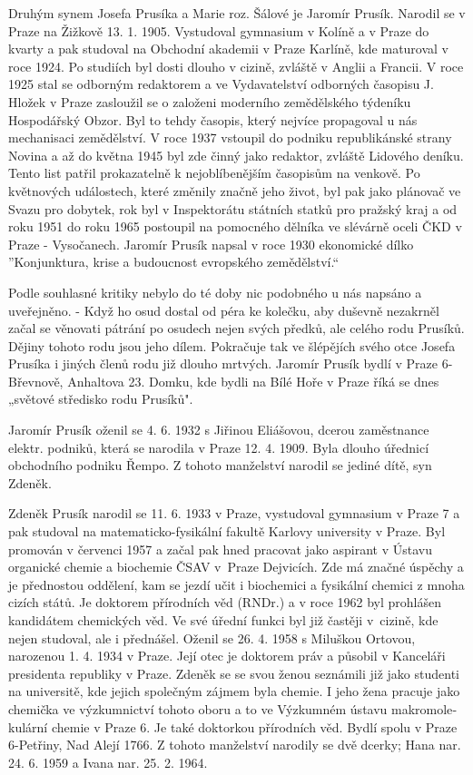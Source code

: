\documentclass[../dejiny-rodu-prusiku.tex]{subfiles}
\begin{document}
Druhým synem Josefa Prusíka a Marie roz. Šálové je Jaromír Prusík. Narodil se v Praze na Žižkově 13. 1. 1905. Vystudoval gymnasium v Kolíně a v Praze do kvarty a pak studoval na Obchodní akademii v Praze Karlíně, kde maturoval v roce 1924. Po studiích byl dosti dlouho v cizi­ně, zvláště v Anglii a Francii. V roce 1925 stal se odbor­ným redaktorem a ve Vydavatelství odborných časopisu  J. Hložek v Praze zasloužil se o založeni moderního zemědělského týdeníku Hospodářský Obzor. Byl to tehdy časopis, který nejvíce propagoval u nás mechanisaci zemědělství. V roce 1937 vstoupil do podniku republikánské strany Novina a až do května 1945 byl zde činný jako redaktor, zvláště Lidového deníku. Tento list patřil prokazatelně k nejoblíbenějším časopisům na venkově. Po květnových událostech, které změnily značně jeho ži­vot, byl pak jako plánovač ve Svazu pro dobytek, rok byl v Inspektorátu státních statků pro pražský kraj a od roku 1951 do roku 1965 postoupil na pomocného dělníka ve slévárně oceli ČKD v Praze - Vysočanech. Jaromír Prusík napsal v roce 1930 ekonomické dílko ''Konjunktura, krise a budoucnost evropského zemědělství.“

Podle souhlasné kritiky nebylo do té doby nic podobného u nás napsáno a uveřejněno. - Když ho osud dostal od péra ke kolečku, aby duševně nezakrněl začal se věnovati pátrání po osudech nejen svých před­ků, ale celého rodu Prusíků. Dějiny tohoto rodu jsou jeho dílem. Pokračuje tak ve šlépějích svého otce Josefa Prusíka i jiných členů rodu již dlouho mrtvých. Jaromír Prusík bydlí v Praze 6-Břevnově, Anhaltova 23. Domku, kde bydli na Bílé Hoře v Praze říká se dnes „světo­vé středisko rodu Prusíků".

Jaromír Prusík oženil se 4. 6. 1932 s Jiřinou Eliášovou, dcerou zaměstnance elektr. podniků, která se narodila v Praze 12. 4. 1909. Byla dlouho úřednicí obchodního podniku Řempo. Z tohoto manželství narodil se jediné dítě, syn Zdeněk.

Zdeněk Prusík narodil se 11. 6. 1933 v Praze, vystudoval gymnasium v Praze 7 a pak studoval na matematicko-fysikální fakultě Karlovy university v Praze. Byl promován v červenci 1957 a začal pak hned pracovat jako aspi­rant v Ústavu organické chemie a biochemie ČSAV v Praze Dejvicích. Zde má značné úspěchy a je přednostou odděle­ní, kam se jezdí učit i biochemici a fysikální chemici z mnoha cizích států. Je doktorem přírodních věd (RNDr.) a v roce 1962 byl prohlášen kandidátem chemických věd. Ve své úřední funkci byl již častěji v cizině, kde nejen studoval, ale i přednášel. Oženil se 26. 4. 1958 s Miluškou Ortovou, narozenou 1. 4. 1934 v Praze. Její otec je doktorem práv a působil v Kanceláři presidenta repu­bliky v Praze. Zdeněk se se svou ženou seznámili již ja­ko studenti na universitě, kde jejich společným zájmem byla chemie. I jeho žena pracuje jako chemička ve výzkum­nictví tohoto oboru a to ve Výzkumném ústavu makromole­kulární chemie v Praze 6. Je také doktorkou přírodních věd. Bydlí spolu v Praze 6-Petřiny, Nad Alejí 1766. Z tohoto manželství narodily se dvě dcerky; Hana nar. 24. 6. 1959 a Ivana nar. 25. 2. 1964.
\end{document}
